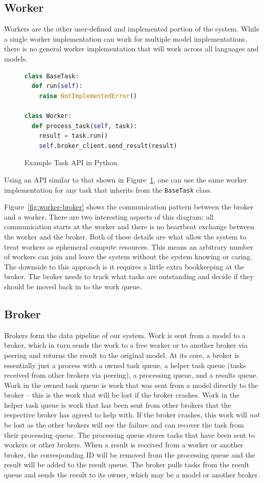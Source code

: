 \documentclass[conference]{IEEEtran}
\begin{document}
\subsection{Worker}
Workers are the other user-defined and implemented portion of the system. While
a single worker implementation can work for multiple model implementations,
there is no general worker implementation that will work across all languages
and models.

\begin{figure}
  \begin{lstlisting}[language=python]
class BaseTask:
  def run(self):
    raise NotImplementedError()

class Worker:
  def process_task(self, task):
    result = task.run()
    self.broker_client.send_result(result)
  \end{lstlisting}
  \caption{Example Task API in Python.}\label{fig:python-api}
\end{figure}

Using an API similar to that shown in Figure~\ref{fig:python-api}, one can use
the same worker implementation for any task that inherits from the
\texttt{BaseTask} class.

Figure~\ref{fig:worker-broker} shows the communication pattern between the
broker and a worker. There are two interesting aspects of this diagram: all
communication starts at the worker and there is no heartbeat exchange between
the worker and the broker. Both of these details are what allow the system to
treat workers as ephemeral compute resources. This means an arbitrary number of
workers can join and leave the system without the system knowing or caring. The
downside to this approach is it requires a little extra bookkeeping at the
broker. The broker needs to track what tasks are outstanding and decide if they
should be moved back in to the work queue.

\subsection{Broker}
Brokers form the data pipeline of our system. Work is sent from a model to a
broker, which in turn sends the work to a free worker or to another broker via
peering and returns the result to
the original model. At its core, a broker is essentially just a process with a
owned task queue, a helper task queue (tasks received from other brokers
via peering), a
processing queue, and a results queue. Work in the owned task queue is work that
was sent from a model directly to the broker -- this is the work that will be
lost if the broker crashes. Work in the helper task queue is work that has been
sent from other brokers that the respective broker has agreed to help with. If
the broker crashes, this work will \emph{not} be lost as the other brokers will
see the failure and can recover the task from their processing queue. The
processing queue stores tasks that have been sent to workers or other
brokers. When a result is received from a worker or another broker, the
corresponding ID will be removed from the processing queue and the result will
be added to the result queue. The broker pulls tasks from the result queue and
sends the result to its owner, which may be a model or another broker.
\end{document}
